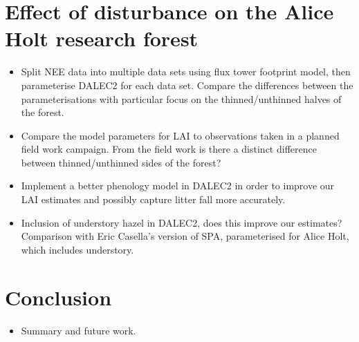 \documentclass[11pt]{article}
\begin{document}
\section{Effect of disturbance on the Alice Holt research forest}
\begin{itemize}
\item Split NEE data into multiple data sets using flux tower footprint model, then parameterise DALEC2 for each data set. Compare the differences between the parameterisations with particular focus on the thinned/unthinned halves of the forest.
\item Compare the model parameters for LAI to observations taken in a planned field work campaign. From the field work is there a distinct difference between thinned/unthinned sides of the forest?
\item Implement a better phenology model in DALEC2 in order to improve our LAI estimates and possibly capture litter fall more accurately.
\item Inclusion of understory hazel in DALEC2, does this improve our estimates? Comparison with Eric Casella's version of SPA, parameterised for Alice Holt, which includes understory.
\end{itemize}


\section{Conclusion}
\begin{itemize}
\item Summary and future work.
\end{itemize}
\end{document}
